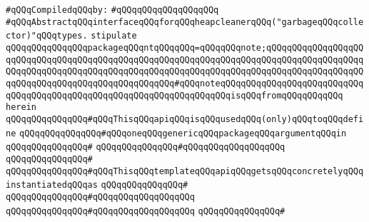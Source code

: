 \newline
\verb|#qQQqCompiledqQQqby:|\newline
\verb|#qQQqqQQqqQQqqQQqqQQq|\newline
\newline
\verb|#qQQqAbstractqQQqinterfaceqQQqforqQQqheapcleanerqQQq("garbageqQQqcollector)"qQQqtypes.|\newline
\newline
\verb|stipulate|\newline
\verb|qQQqqQQqqQQqqQQqpackageqQQqntqQQqqQQq=qQQqqQQqnote;qQQqqQQqqQQqqQQqqQQqqQQqqQQqqQQqqQQqqQQqqQQqqQQqqQQqqQQqqQQqqQQqqQQqqQQqqQQqqQQqqQQqqQQqqQQqqQQqqQQqqQQqqQQqqQQqqQQqqQQqqQQqqQQqqQQqqQQqqQQqqQQqqQQqqQQqqQQqqQQqqQQqqQQqqQQqqQQqqQQqqQQqqQQqqQQq#qQQqnoteqQQqqQQqqQQqqQQqqQQqqQQqqQQqqQQqqQQqqQQqqQQqqQQqqQQqqQQqqQQqqQQqqQQqqQQqisqQQqfromqQQqqQQqqQQq|\newline
\verb|herein|\newline
\newline
\verb|qQQqqQQqqQQqqQQq#qQQqThisqQQqapiqQQqisqQQqusedqQQq(only)qQQqtoqQQqdefine|\newline
\verb|qQQqqQQqqQQqqQQq#qQQqoneqQQqgenericqQQqpackageqQQqargumentqQQqin|\newline
\verb|qQQqqQQqqQQqqQQq#|\newline
\verb|qQQqqQQqqQQqqQQq#qQQqqQQqqQQqqQQqqQQq|\newline
\verb|qQQqqQQqqQQqqQQq#|\newline
\verb|qQQqqQQqqQQqqQQq#qQQqThisqQQqtemplateqQQqapiqQQqgetsqQQqconcretelyqQQqinstantiatedqQQqas|\newline
\verb|qQQqqQQqqQQqqQQq#|\newline
\verb|qQQqqQQqqQQqqQQq#qQQqqQQqqQQqqQQqqQQq|\newline
\verb|qQQqqQQqqQQqqQQq#qQQqqQQqqQQqqQQqqQQq|\newline
\verb|qQQqqQQqqQQqqQQq#|\newline
